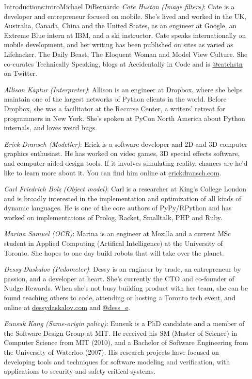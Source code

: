 \begin{aosachapter}{Introduction}{s:intro}{Michael DiBernardo}
\emph{Cate Huston (Image filters)}: Cate is a developer and entrepreneur focused on mobile. She’s lived and worked in the UK, Australia, Canada, China and the United States, as an engineer at Google, an Extreme Blue intern at IBM, and a ski instructor. Cate speaks internationally on mobile development, and her writing has been published on sites as varied as Lifehacker, The Daily Beast, The Eloquent Woman and Model View Culture. She co-curates Technically Speaking, blogs at Accidentally in Code and is \url{@catehstn} on Twitter.

\emph{Allison Kaptur (Interpreter)}: Allison is an engineer at Dropbox, where she helps maintain one of the largest networks of Python clients in the world. Before Dropbox, she was a facilitator at the Recurse Center, a writers' retreat for programmers in New York. She's spoken at PyCon North America about Python internals, and loves weird bugs.

\emph{Erick Dransch (Modeller)}: Erick is a software developer and 2D and 3D computer graphics enthusiast. He has worked on video games, 3D special effects software, and computer-aided design tools. If it involves simulating reality, chances are he'd like to learn more about it. You can find him online at \url{erickdransch.com}.

\emph{Carl Friedrich Bolz (Object model)}: Carl is a researcher at King's College London and is broadly interested in the implementation and optimization of all kinds of dynamic languages. He is one of the core authors of PyPy/RPython and has worked on implementations of Prolog, Racket, Smalltalk, PHP and Ruby. 

\emph{Marina Samuel (OCR)}: Marina is an engineer at Mozilla and a current MSc student in Applied Computing (Artifical Intelligence) at the University of Toronto. She hopes to one day build robots that will take over the planet.

\emph{Dessy Daskalov (Pedometer)}: Dessy is an engineer by trade, an entrepreneur by passion, and a developer at heart. She's currently the CTO and co-founder of Nudge Rewards. When she’s not busy building product with her team, she can be found teaching others to code, attending or hosting a Toronto tech event, and online at \url{dessydaskalov.com} and \url{@dess_e}.

\emph{Eunsuk Kang (Same-origin policy)}: Eunsuk is a PhD candidate and a member of the Software Design Group at MIT. He received his SM (Master of Science) in Computer Science from MIT (2010), and a Bachelor of Software Engineering from the University of Waterloo (2007). His research projects have focused on developing tools and techniques for software modeling and verification, with applications to security and safety-critical systems.


\end{aosachapter}
